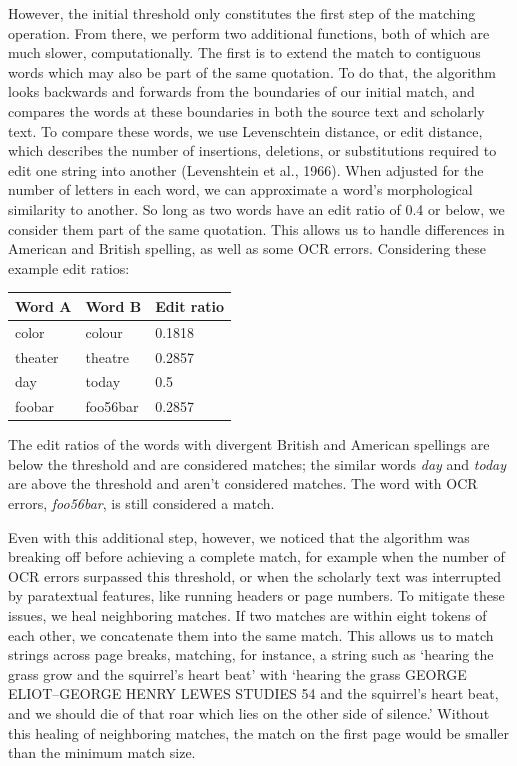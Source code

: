 \documentclass[
]{article}
\begin{document}
However, the initial threshold only constitutes the first step of the
matching operation. From there, we perform two additional functions,
both of which are much slower, computationally. The first is to extend
the match to contiguous words which may also be part of the same
quotation. To do that, the algorithm looks backwards and forwards from
the boundaries of our initial match, and compares the words at these
boundaries in both the source text and scholarly text. To compare these
words, we use Levenschtein distance, or edit distance, which describes
the number of insertions, deletions, or substitutions required to edit
one string into another (Levenshtein et al., 1966). When adjusted for
the number of letters in each word, we can approximate a word's
morphological similarity to another. So long as two words have an edit
ratio of 0.4 or below, we consider them part of the same quotation. This
allows us to handle differences in American and British spelling, as
well as some OCR errors. Considering these example edit ratios:

\begin{longtable}[]{@{}lll@{}}
\toprule
Word A & Word B & Edit ratio \\
\midrule
\endhead
color & colour & 0.1818 \\
theater & theatre & 0.2857 \\
day & today & 0.5 \\
foobar & foo56bar & 0.2857 \\
\bottomrule
\end{longtable}

The edit ratios of the words with divergent British and American
spellings are below the threshold and are considered matches; the
similar words \emph{day} and \emph{today} are above the threshold and
aren't considered matches. The word with OCR errors, \emph{foo56bar}, is
still considered a match.

Even with this additional step, however, we noticed that the algorithm
was breaking off before achieving a complete match, for example when the
number of OCR errors surpassed this threshold, or when the scholarly
text was interrupted by paratextual features, like running headers or
page numbers. To mitigate these issues, we heal neighboring matches. If
two matches are within eight tokens of each other, we concatenate them
into the same match. This allows us to match strings across page breaks,
matching, for instance, a string such as `hearing the grass grow and the
squirrel's heart beat' with `hearing the grass GEORGE ELIOT--GEORGE
HENRY LEWES STUDIES 54 and the squirrel's heart beat, and we should die
of that roar which lies on the other side of silence.' Without this
healing of neighboring matches, the match on the first page would be
smaller than the minimum match size.
\end{document}
